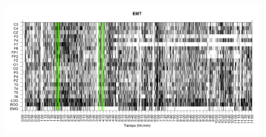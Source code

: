 \begin{figure}
\centering
\includegraphics[width=0.8\linewidth]
{./img_ejemplos/EMNNS_est.png} 
\label{grf_EMT}
\end{figure}


